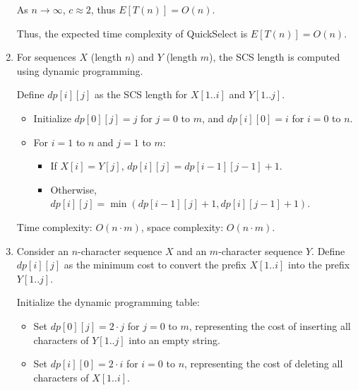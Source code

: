 \documentclass[12pt,a4paper]{article}
\begin{document}
\begin{enumerate}
        As \( n \to \infty \), \( c \approx 2 \), thus \( E[T(n)] = O(n) \).


        Thus, the expected time complexity of QuickSelect is \( E[T(n)] = O(n) \).

    \item For sequences \( X \) (length \( n \)) and \( Y \) (length \( m \)), the SCS length is computed using dynamic programming.

Define \( dp[i][j] \) as the SCS length for \( X[1..i] \) and \( Y[1..j] \).

\begin{itemize}
    \item Initialize \( dp[0][j] = j \) for \( j = 0 \) to \( m \), and \( dp[i][0] = i \) for \( i = 0 \) to \( n \).
    \item For \( i = 1 \) to \( n \) and \( j = 1 \) to \( m \):
        \begin{itemize}
            \item If \( X[i] = Y[j] \), \( dp[i][j] = dp[i-1][j-1] + 1 \).
            \item Otherwise, \( dp[i][j] = \min(dp[i-1][j] + 1, dp[i][j-1] + 1) \).
        \end{itemize}
\end{itemize}

Time complexity: \( O(n \cdot m) \), space complexity: \( O(n \cdot m) \).

    \item Consider an \( n \)-character sequence \( X \) and an \( m \)-character sequence \( Y \). Define \( dp[i][j] \) as the minimum cost to convert the prefix \( X[1..i] \) into the prefix \( Y[1..j] \).

    Initialize the dynamic programming table:
        \begin{itemize}
            \item Set \( dp[0][j] = 2 \cdot j \) for \( j = 0 \) to \( m \), representing the cost of inserting all characters of \( Y[1..j] \) into an empty string.
            \item Set \( dp[i][0] = 2 \cdot i \) for \( i = 0 \) to \( n \), representing the cost of deleting all characters of \( X[1..i] \).
        \end{itemize}


\end{enumerate}
\end{document}
